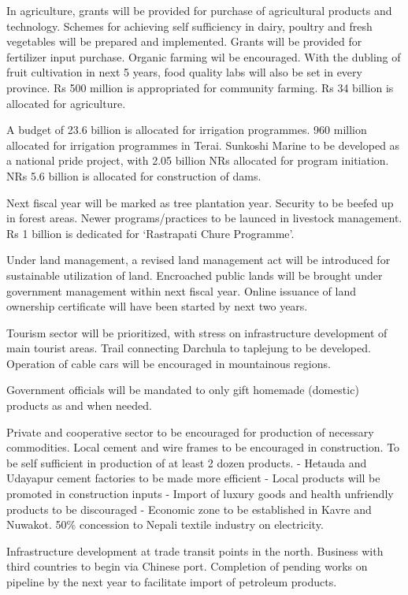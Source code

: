 \documentclass[
]{book}
\begin{document}
In agriculture, grants will be provided for purchase of agricultural products and technology. Schemes for achieving self sufficiency in dairy, poultry and fresh vegetables will be prepared and implemented. Grants will be provided for fertilizer input purchase. Organic farming wil be encouraged. With the dubling of fruit cultivation in next 5 years, food quality labs will also be set in every province. Rs 500 million is appropriated for community farming. Rs 34 billion is allocated for agriculture.

A budget of 23.6 billion is allocated for irrigation programmes. 960 million allocated for irrigation programmes in Terai. Sunkoshi Marine to be developed as a national pride project, with 2.05 billion NRs allocated for program initiation. NRs 5.6 billion is allocated for construction of dams.

Next fiscal year will be marked as tree plantation year. Security to be beefed up in forest areas. Newer programs/practices to be launced in livestock management. Rs 1 billion is dedicated for `Rastrapati Chure Programme'.

Under land management, a revised land management act will be introduced for sustainable utilization of land. Encroached public lands will be brought under government management within next fiscal year. Online issuance of land ownership certificate will have been started by next two years.

Tourism sector will be prioritized, with stress on infrastructure development of main tourist areas. Trail connecting Darchula to taplejung to be developed. Operation of cable cars will be encouraged in mountainous regions.

Government officials will be mandated to only gift homemade (domestic) products as and when needed.

Private and cooperative sector to be encouraged for production of necessary commodities. Local cement and wire frames to be encouraged in construction. To be self sufficient in production of at least 2 dozen products.
- Hetauda and Udayapur cement factories to be made more efficient
- Local products will be promoted in construction inputs
- Import of luxury goods and health unfriendly products to be discouraged
- Economic zone to be established in Kavre and Nuwakot. 50\% concession to Nepali textile industry on electricity.

Infrastructure development at trade transit points in the north. Business with third countries to begin via Chinese port. Completion of pending works on pipeline by the next year to facilitate import of petroleum products.
\end{document}
